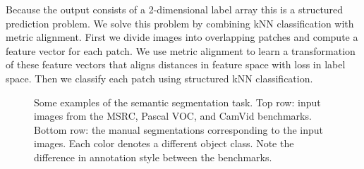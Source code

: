\documentclass[a4paper,titlepage]{article}
\begin{document}
Because the output consists of a 2-dimensional label array this is a structured prediction problem. We solve this problem by combining \ac{kNN} classification with metric alignment. First we divide images into overlapping patches and compute a feature vector for each patch. We use metric alignment to learn a transformation of these feature vectors that aligns distances in feature space with loss in label space. Then we classify each patch using structured \ac{kNN} classification.

\begin{figure}[tbh]
\begin{center}
\caption{Some examples of the semantic segmentation task. Top row: input images from the MSRC, Pascal VOC, and CamVid benchmarks. Bottom row: the manual segmentations corresponding to the input images. Each color denotes a different object class. Note the difference in annotation style between the benchmarks.}
\label{fig:segmentation_examples}
\end{center}
\end{figure}

\end{document}
